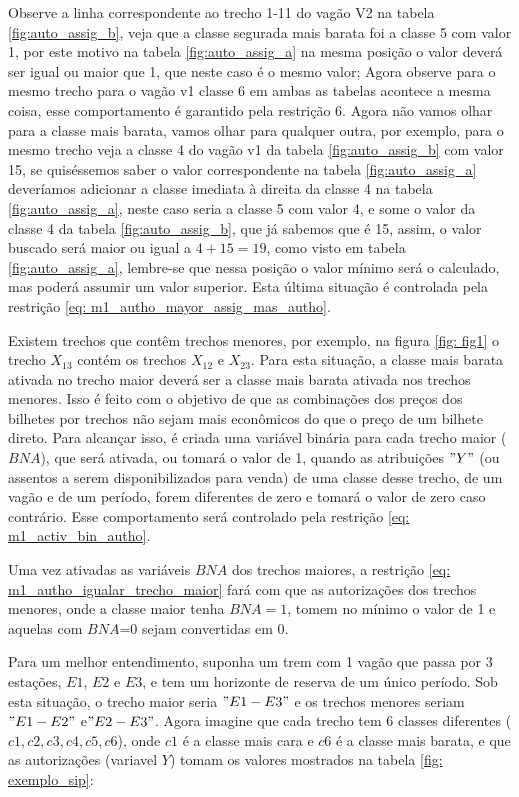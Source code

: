 Observe a linha correspondente ao trecho 1-11 do vagão V2 na tabela \ref{fig:auto_assig_b}, veja que a classe segurada mais barata foi a classe 5 com valor 1, por este motivo na tabela \ref{fig:auto_assig_a} na mesma posição o valor deverá ser igual ou maior que 1, que neste caso é o mesmo valor; Agora observe para o mesmo trecho para o vagão v1 classe 6 em ambas as tabelas acontece a mesma coisa, esse comportamento é garantido pela restrição 6. Agora não vamos olhar para a classe mais barata, vamos olhar para qualquer outra, por exemplo, para o mesmo trecho veja a classe 4 do vagão v1 da tabela \ref{fig:auto_assig_b} com valor 15, se quiséssemos saber o valor correspondente na tabela \ref{fig:auto_assig_a} deveríamos adicionar a classe imediata à direita da classe 4 na tabela \ref{fig:auto_assig_a}, neste caso seria a classe 5 com valor 4, e some o valor da classe 4 da tabela \ref{fig:auto_assig_b}, que já sabemos que é 15, assim, o valor buscado será maior ou igual a $4+15 = 19$, como visto em tabela \ref{fig:auto_assig_a}, lembre-se que nessa posição o valor mínimo será o calculado, mas poderá assumir um valor superior. Esta última situação é controlada pela restrição \ref{eq: m1_autho_mayor_assig_mas_autho}.

Existem trechos que contêm trechos menores, por exemplo, na figura \ref{fig: fig1} o trecho $X_{13}$ contém os trechos $X_{12}$ e $X_{23}$. Para esta situação, a classe mais barata ativada no trecho maior deverá ser a classe mais barata ativada nos trechos menores. Isso é feito com o objetivo de que as combinações dos preços dos bilhetes por trechos não sejam mais econômicos do que o preço de um bilhete direto. Para alcançar isso, é criada uma variável binária para cada trecho maior ($BNA$), que será ativada, ou tomará o valor de 1, quando as atribuições $"Y"$ (ou assentos a serem disponibilizados para venda) de uma classe desse trecho, de um vagão e de um período, forem diferentes de zero e tomará o valor de zero caso contrário. Esse comportamento será controlado pela restrição \ref{eq: m1_activ_bin_autho}.

Uma vez ativadas as variáveis $BNA$ dos trechos maiores, a restrição \ref{eq: m1_autho_igualar_trecho_maior} fará com que as autorizações dos trechos menores, onde a classe maior tenha $BNA=1$, tomem no mínimo o valor de 1 e aquelas com $BNA$=0 sejam convertidas em 0.

Para um melhor entendimento, suponha um trem com 1 vagão que passa por 3 estações, $E1$, $E2$ e $E3$, e tem um horizonte de reserva de um único período. Sob esta situação, o trecho maior seria $"E1-E3"$ e os trechos menores seriam $"E1-E2"$ e$" E2-E3"$. Agora imagine que cada trecho tem 6 classes diferentes ($c1, c2, c3, c4, c5, c6$), onde $c1$ é a classe mais cara e $c6$ é a classe mais barata, e que as autorizações (variavel $Y$) tomam os valores mostrados na tabela \ref{fig: exemplo_sip}:

